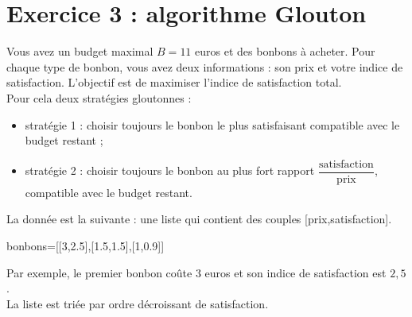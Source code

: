 \section*{Exercice 3 : algorithme Glouton}
Vous avez un budget maximal $B=11$ euros et des bonbons à acheter. Pour chaque type de bonbon, vous avez deux informations : son prix et votre indice de satisfaction. L'objectif est de maximiser l'indice de satisfaction total.\\
Pour cela deux stratégies gloutonnes :
\begin{itemize}
\item stratégie 1 : choisir toujours le bonbon le plus satisfaisant compatible avec le budget restant ;
\item stratégie 2 : choisir toujours le bonbon au plus fort rapport $\dfrac{\text{satisfaction}}{\text{prix}}$, compatible avec le budget restant.
\end{itemize}
La donnée est la suivante : une liste qui contient des couples [prix,satisfaction]. 
\begin{center}
bonbons=[[3,2.5],[1.5,1.5],[1,0.9]]
\end{center}
Par exemple, le premier bonbon coûte 3 euros et son indice de satisfaction est $2,5$.\\
La liste est triée par ordre décroissant de satisfaction.
